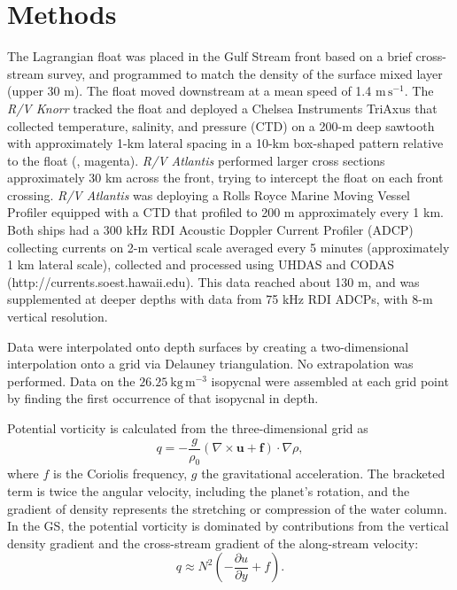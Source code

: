 \documentclass{article}
\begin{document}
\section{Methods}

The Lagrangian float\cite{dasaro03} was placed in the Gulf Stream front based on a brief cross-stream survey, and programmed to match the density of the surface mixed layer (upper 30 m).  The float moved downstream at a mean speed of 1.4 $\mathrm{m\,s^{-1}}$.  The \emph{R/V Knorr} tracked the float and deployed a Chelsea Instruments TriAxus that  collected temperature, salinity, and pressure (CTD) on a 200-m deep sawtooth with approximately 1-km lateral spacing in a 10-km box-shaped pattern relative to the float (, magenta).  \emph{R/V Atlantis} performed larger cross sections approximately 30 km across the front, trying to intercept the float on each front crossing.  \emph{R/V Atlantis} was deploying a Rolls Royce Marine Moving Vessel Profiler equipped with a CTD that profiled to 200 m approximately every 1 km.  Both ships had a 300 kHz RDI Acoustic Doppler Current Profiler (ADCP) collecting currents on 2-m vertical scale averaged every 5 minutes (approximately 1 km lateral scale), collected and processed using UHDAS and CODAS (http://currents.soest.hawaii.edu\cite{firingetal12}).  This data reached about 130 m, and was supplemented at deeper depths with data from 75 kHz RDI ADCPs, with 8-m vertical resolution.  

Data were interpolated onto depth surfaces by creating a two-dimensional interpolation onto a grid via Delauney triangulation. No extrapolation was performed.  Data on the $26.25\ \mathrm{kg\,m^{-3}}$ isopycnal were assembled at each grid point by finding the first occurrence of that isopycnal in depth.  

Potential vorticity is calculated from the three-dimensional grid as
\begin{equation}
  q = -\frac{g}{\rho_0}\left(\nabla \times\mathbf{u}+\mathbf{f}\right) \cdot \nabla\rho,
\end{equation}
where $f$ is the Coriolis frequency, $g$ the gravitational acceleration. The bracketed term is twice the angular velocity, including the planet's rotation, and the gradient of density represents the stretching or compression of the water column.  In the GS, the potential vorticity is dominated by contributions from the vertical density gradient and the cross-stream gradient of the along-stream velocity:
\begin{equation}
  q \approx N^2\left(-\frac{\partial u}{\partial y}+f\right).
\end{equation}
\end{document}
